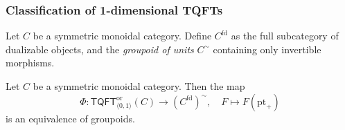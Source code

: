 \documentclass[xcolor=dvipsnames]{beamer}
\begin{document}
\begin{frame}
    \frametitle{Classification of 1-dimensional TQFTs} 
    \begin{definition}
        Let $C$ be a symmetric monoidal category. Define $C ^{\mathrm{fd}}$ as the full subcategory of dualizable objects, and the \emph{groupoid of units} $C ^{\sim}$ containing only invertible morphisms.
    \end{definition}
    \begin{theorem} 
       Let $C$ be a symmetric monoidal category. Then the map \[
           \Phi \colon \mathsf{TQFT}^{\mathrm{or}}_{\langle 0,1 \rangle }(C) \to (C ^{\mathrm{fd}}) ^{\sim}, \quad F \mapsto F ( \mathrm{pt}_+)
       \]  is an equivalence of groupoids.

    \end{theorem}
    
\end{frame}
\end{document}
